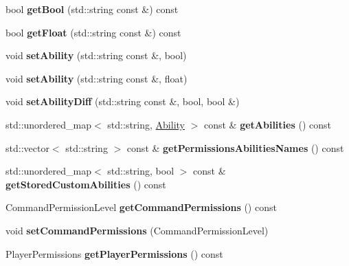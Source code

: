 \begin{DoxyCompactItemize}
bool {\bfseries get\+Bool} (std\+::string const \&) const
\item 
\mbox{\label{struct_abilities_a7fe1bea6a4b43a99ae01f5141c7402b3}} 
bool {\bfseries get\+Float} (std\+::string const \&) const
\item 
\mbox{\label{struct_abilities_a68b9039ef5396e0a26d2475693b4d4c5}} 
void {\bfseries set\+Ability} (std\+::string const \&, bool)
\item 
\mbox{\label{struct_abilities_a6e3791dd94683483e054269377b22679}} 
void {\bfseries set\+Ability} (std\+::string const \&, float)
\item 
\mbox{\label{struct_abilities_a5f93193eb0bab3ff85be2e29a35b5a84}} 
void {\bfseries set\+Ability\+Diff} (std\+::string const \&, bool, bool \&)
\item 
\mbox{\label{struct_abilities_a2933a51097b049b33f72afc5d1e952d2}} 
std\+::unordered\+\_\+map$<$ std\+::string, \mbox{\hyperlink{struct_ability}{Ability}} $>$ const  \& {\bfseries get\+Abilities} () const
\item 
\mbox{\label{struct_abilities_a64c365b006b8d18e3f0a88a42130c565}} 
std\+::vector$<$ std\+::string $>$ const  \& {\bfseries get\+Permissions\+Abilities\+Names} () const
\item 
\mbox{\label{struct_abilities_aa22d4b6a25396fe3b972759a0eb324e0}} 
std\+::unordered\+\_\+map$<$ std\+::string, bool $>$ const  \& {\bfseries get\+Stored\+Custom\+Abilities} () const
\item 
\mbox{\label{struct_abilities_afaa6414b40b7f4cf6893680bb7893f27}} 
Command\+Permission\+Level {\bfseries get\+Command\+Permissions} () const
\item 
\mbox{\label{struct_abilities_ae1f1d42207c4aa6a751443a86ac0244a}} 
void {\bfseries set\+Command\+Permissions} (Command\+Permission\+Level)
\item 
\mbox{\label{struct_abilities_a0ba414150f9fdb6c5bccf136392203b2}} 
Player\+Permissions {\bfseries get\+Player\+Permissions} () const

\end{DoxyCompactItemize}
